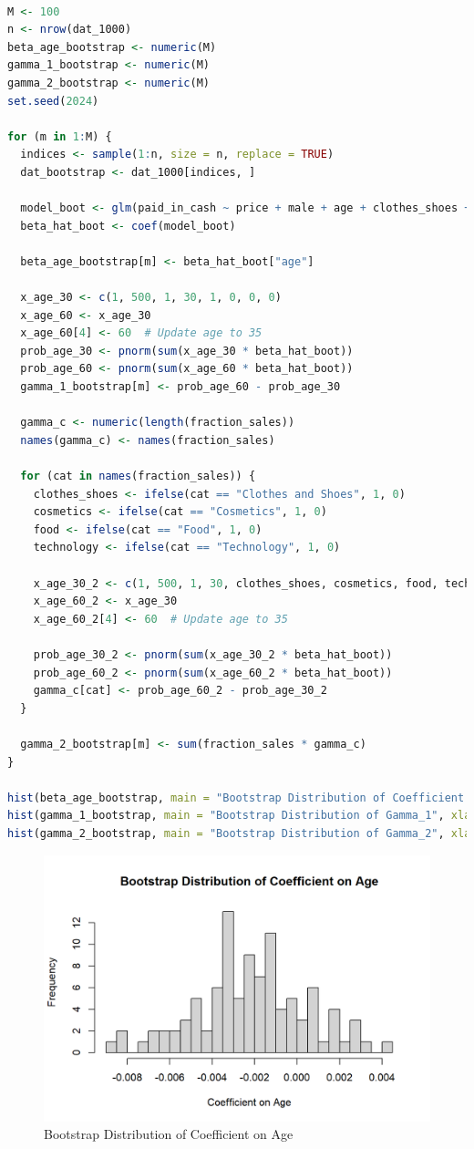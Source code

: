 \documentclass[a4paper,12pt]{article} %
\theoremstyle{nonitalic}
\newenvironment{solution}[1]
  {\renewcommand\theinnercustomsol{#1}\innercustomsol}
  {\endinnercustomsol}
\newcounter{solutionctr}[section]
\renewcommand{\thesolutionctr}{(\alph{solutionctr})}
\newenvironment{autosolution}
  {\stepcounter{solutionctr}\begin{solution}{\thesolutionctr}}
  {\end{solution}}
\begin{document}
\begin{autosolution}
    \

    \begin{lstlisting}[language=R]
M <- 100
n <- nrow(dat_1000)
beta_age_bootstrap <- numeric(M)
gamma_1_bootstrap <- numeric(M)
gamma_2_bootstrap <- numeric(M)
set.seed(2024)

for (m in 1:M) {
  indices <- sample(1:n, size = n, replace = TRUE)
  dat_bootstrap <- dat_1000[indices, ]
  
  model_boot <- glm(paid_in_cash ~ price + male + age + clothes_shoes + cosmetics + food + technology, data = dat_bootstrap, family = binomial(link = "probit"))
  beta_hat_boot <- coef(model_boot)
  
  beta_age_bootstrap[m] <- beta_hat_boot["age"]
  
  x_age_30 <- c(1, 500, 1, 30, 1, 0, 0, 0)
  x_age_60 <- x_age_30
  x_age_60[4] <- 60  # Update age to 35
  prob_age_30 <- pnorm(sum(x_age_30 * beta_hat_boot))
  prob_age_60 <- pnorm(sum(x_age_60 * beta_hat_boot))
  gamma_1_bootstrap[m] <- prob_age_60 - prob_age_30
  
  gamma_c <- numeric(length(fraction_sales))
  names(gamma_c) <- names(fraction_sales)
  
  for (cat in names(fraction_sales)) {
    clothes_shoes <- ifelse(cat == "Clothes and Shoes", 1, 0)
    cosmetics <- ifelse(cat == "Cosmetics", 1, 0)
    food <- ifelse(cat == "Food", 1, 0)
    technology <- ifelse(cat == "Technology", 1, 0)
    
    x_age_30_2 <- c(1, 500, 1, 30, clothes_shoes, cosmetics, food, technology)
    x_age_60_2 <- x_age_30
    x_age_60_2[4] <- 60  # Update age to 35
    
    prob_age_30_2 <- pnorm(sum(x_age_30_2 * beta_hat_boot))
    prob_age_60_2 <- pnorm(sum(x_age_60_2 * beta_hat_boot))
    gamma_c[cat] <- prob_age_60_2 - prob_age_30_2
  }
  
  gamma_2_bootstrap[m] <- sum(fraction_sales * gamma_c)
}

hist(beta_age_bootstrap, main = "Bootstrap Distribution of Coefficient on Age", xlab = "Coefficient on Age", breaks = 20)
hist(gamma_1_bootstrap, main = "Bootstrap Distribution of Gamma_1", xlab = "Gamma_1", breaks = 20)
hist(gamma_2_bootstrap, main = "Bootstrap Distribution of Gamma_2", xlab = "Gamma_2", breaks = 20)
    \end{lstlisting}

    \begin{figure}[!htbp]
        \centering
        \includegraphics[width=0.5\linewidth]{g-1.png}
        \caption{Bootstrap Distribution of Coefficient on Age}
        \label{fig:g-1}


\end{figure}
\end{autosolution}
\end{document}
